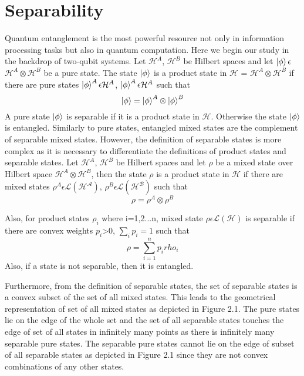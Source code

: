 \section{Separability}
Quantum entanglement is the most powerful resource not only in information processing tasks but also in quantum computation. Here we begin our study in the backdrop of two-qubit systems.
Let $\mathcal{H}^A$, $\mathcal{H}^B$ be Hilbert spaces and let $\ket{\phi} \epsilon$ $\mathcal{H}^A \otimes \mathcal{H}^B$ be a pure state. The state $\ket{\phi}$ is a product state in $\mathcal{H}$ = $\mathcal{H}^A \otimes \mathcal{H}^B$ if there are pure states $\ket{\phi}^A \epsilon \mathcal{H}^A$, $\ket{\phi}^A \epsilon \mathcal{H}^A$ such that 
\begin{equation}
    \ket{\phi} = \ket{\phi}^A \otimes \ket{\phi}^B
\end{equation}
A pure state $\ket{\phi}$ is separable if it is a product state in $\mathcal{H}$. Otherwise the state $\ket{\phi}$ is entangled.
Similarly to pure states, entangled mixed states are the
complement of separable mixed states. However, the definition of
separable states is more complex as it is necessary to differentiate the
definitions of product states and separable states.
Let $\mathcal{H}^A$, $\mathcal{H}^B$ be Hilbert spaces and let $\rho$ be a mixed state over Hilbert space $\mathcal{H}^A \otimes \mathcal{H}^B$, then the state $\rho$ is a product state in $\mathcal{H}$ if there are mixed states $\rho^A \epsilon \mathcal{L}(\mathcal{H^A})$, $\rho^B \epsilon \mathcal{L}(\mathcal{H^B})$ such that
\begin{equation}
    \rho = \rho^A \otimes \rho^B
\end{equation}

Also, for product states ${\rho_i}$ where i=1,2...n, mixed state $\rho \epsilon \mathcal{L}(\mathcal{H})$ is separable if there are convex weights $p_i$>0, $\sum_i p_i = 1$ such that
\begin{equation}
    \rho = \sum_{i=1}^n p_i rho_i
\end{equation}
Also, if a state is not separable, then it is entangled.

 Furthermore, from the definition of separable states, the set of separable states is a convex subset of the set of all mixed states. This leads to the geometrical representation of set of all mixed states as depicted in Figure
2.1. The pure states lie on the edge of the whole set and the set of all
separable states touches the edge of set of all states in infinitely many
points as there is infinitely many separable pure states. The separable
pure states cannot lie on the edge of subset of all separable states as
depicted in Figure 2.1 since they are not convex combinations of any
other states.

